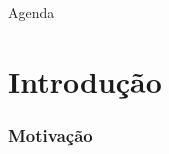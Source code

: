 \documentclass{beamer}
\date{Manaus, 30 de Julho de 2018}
\begin{document}
\begin{frame}
 \maketitle
\end{frame}

\begin{frame}{Agenda}
  \tableofcontents
\end{frame}

\section{Introdu\c{c}\~ao}


\begin{frame}
\frametitle{Motiva\c{c}\~ao}
\pause


\end{frame}
\end{document}
